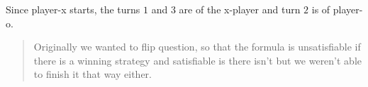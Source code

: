 \documentclass{base}
\begin{document}
Since player-x starts, the turns $1$ and $3$  are of the x-player and turn $2$ is of player-o.

\vspace*{2em} 
\begin{quote} 
\centering 
Originally we wanted to flip question, so that the formula is unsatisfiable if there is a winning strategy and satisfiable is there isn't but we weren't able to finish it that way either.
\end{quote}
\vspace*{2em}

\end{document}
